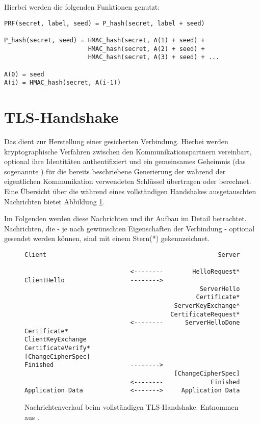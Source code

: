 Hierbei werden die folgenden Funktionen genutzt:

\begin{lstlisting}
PRF(secret, label, seed) = P_hash(secret, label + seed)

P_hash(secret, seed) = HMAC_hash(secret, A(1) + seed) +
					   HMAC_hash(secret, A(2) + seed) +
					   HMAC_hash(secret, A(3) + seed) + ...

A(0) = seed
A(i) = HMAC_hash(secret, A(i-1))
\end{lstlisting}

\section{TLS-Handshake}

Das \handshakeprotocol{} dient zur Herstellung einer gesicherten Verbindung. Hierbei werden kryptographische Verfahren zwischen den Kommunikationspartnern vereinbart, optional ihre Identitäten authentifiziert und ein gemeinsames Geheimnis (das sogenannte \premastersecret{}) für die bereits beschriebene Generierung der während der eigentlichen Kommunikation verwendeten Schlüssel übertragen oder berechnet. Eine Übersicht über die während eines vollständigen Handshakes ausgetauschten Nachrichten bietet Abbildung \ref{fig_complete_handshake}. 

Im Folgenden werden diese Nachrichten und ihr Aufbau im Detail betrachtet. Nachrichten, die - je nach gewünschten Eigenschaften der Verbindung - optional gesendet werden können, sind mit einem Stern(*) gekennzeichnet.


\begin{figure}[]%
	\centering
	\begin{lstlisting}
Client                                               Server

                             <--------        HelloRequest*
ClientHello                  -------->
                                                ServerHello
                                               Certificate*
                                         ServerKeyExchange*
                                        CertificateRequest*
                             <--------      ServerHelloDone
Certificate*
ClientKeyExchange
CertificateVerify*
[ChangeCipherSpec]
Finished                     -------->
                                         [ChangeCipherSpec]
                             <--------             Finished
Application Data             <------->     Application Data
	\end{lstlisting}
	\caption{Nachrichtenverlauf beim vollständigen TLS-Handshake. Entnommen aus \cite{tls12}.}
	\label{fig_complete_handshake}
\end{figure}

